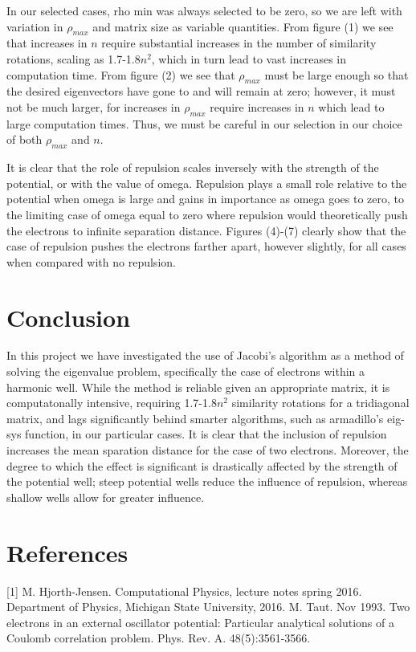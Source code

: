 \documentclass[11pt,a4paper]{article}
\begin{document}
{In our selected cases, rho min was always selected to be zero, so we are left with variation in $\rho_{max}$ and matrix size as variable quantities. From figure (1) we see that increases in $n$ require substantial increases in the number of similarity rotations, scaling as 1.7-1.8$n^2$, which in turn lead to vast increases in computation time. From figure (2) we see that $\rho_{max}$ must be large enough so that the desired eigenvectors have gone to and will remain at zero; however, it must not be much larger, for increases in $\rho_{max}$ require increases in $n$ which lead to large computation times. Thus, we must be careful in our selection in our choice of both $\rho_{max}$ and $n$.

It is clear that the role of repulsion scales inversely with the strength of the potential, or with the value of omega. Repulsion plays a small role relative to the potential when omega is large and gains in importance as omega goes to zero, to the limiting case of omega equal to zero where repulsion would theoretically push the electrons to infinite separation distance. Figures (4)-(7) clearly show that the case of repulsion pushes the electrons farther apart, however slightly, for all cases when compared with no repulsion.

\section{Conclusion}

In this project we have investigated the use of Jacobi's algorithm as a method of solving the eigenvalue problem, specifically the case of electrons within a harmonic well. While the method is reliable given an appropriate matrix, it is computatonally intensive, requiring 1.7-1.8$n^2$ similarity rotations for a tridiagonal matrix, and lags significantly behind smarter algorithms, such as armadillo's eig-sys function, in our particular cases. It is clear that the inclusion of repulsion increases the mean sparation distance for the case of two electrons. Moreover, the degree to which the effect is significant is drastically affected by the strength of the potential well; steep potential wells reduce the influence of repulsion, whereas shallow wells allow for greater influence. 

\section{References}

[1] M. Hjorth-Jensen. Computational Physics, lecture notes spring 2016. Department of Physics, Michigan State University, 2016. \newline
[2] M. Taut. Nov 1993. Two electrons in an external oscillator potential: Particular analytical solutions of a Coulomb correlation problem. Phys. Rev. A. 48(5):3561-3566.

}
\end{document}
